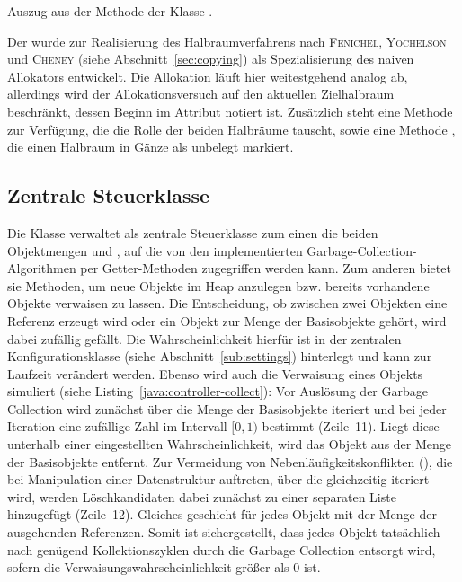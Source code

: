 \begin{listing}[h]
	\inputminted[]{java}{code/NaiveAlloc-allocate.java}
	\caption[Methode  der Klasse ]{Auszug aus der Methode  der Klasse .}
	\label{java:naive-alloc}
\end{listing}

Der  wurde zur Realisierung des Halbraumverfahrens nach \textsc{Fenichel}, \textsc{Yochelson} und \textsc{Cheney} (siehe Abschnitt~\ref{sec:copying}) als Spezialisierung des naiven Allokators entwickelt.
Die Allokation läuft hier weitestgehend analog ab, allerdings wird der Allokationsversuch auf den aktuellen Zielhalbraum beschränkt, dessen Beginn im Attribut  notiert ist.
Zusätzlich steht eine Methode  zur Verfügung, die die Rolle der beiden Halbräume tauscht, sowie eine Methode , die einen Halbraum in Gänze als unbelegt markiert.

\subsection{Zentrale Steuerklasse }
\label{sub:controller}
Die Klasse  verwaltet als zentrale Steuerklasse zum einen die beiden Objektmengen  und , auf die von den implementierten Garbage-Collection-Algorithmen per Getter-Methoden zugegriffen werden kann.
Zum anderen bietet sie Methoden, um neue Objekte im Heap anzulegen bzw. bereits vorhandene Objekte verwaisen zu lassen.
Die Entscheidung, ob zwischen zwei Objekten eine Referenz erzeugt wird oder ein Objekt zur Menge der Basisobjekte gehört, wird dabei zufällig gefällt.
Die Wahrscheinlichkeit hierfür ist in der zentralen Konfigurationsklasse  (siehe Abschnitt~\ref{sub:settings}) hinterlegt und kann zur Laufzeit verändert werden.
Ebenso wird auch die Verwaisung eines Objekts simuliert (siehe Listing~\ref{java:controller-collect}):
Vor Auslösung der Garbage Collection wird zunächst über die Menge der Basisobjekte iteriert und bei jeder Iteration eine zufällige Zahl im Intervall $[0,1)$ bestimmt (Zeile~11).
Liegt diese unterhalb einer eingestellten Wahrscheinlichkeit, wird das Objekt aus der Menge der Basisobjekte entfernt.
Zur Vermeidung von Nebenläufigkeitskonflikten (), die bei Manipulation einer Datenstruktur auftreten, über die gleichzeitig iteriert wird, werden Löschkandidaten dabei zunächst zu einer separaten Liste hinzugefügt (Zeile~12).
Gleiches geschieht für jedes Objekt mit der Menge  der ausgehenden Referenzen.
Somit ist sichergestellt, dass jedes Objekt tatsächlich nach genügend Kollektionszyklen durch die Garbage Collection entsorgt wird, sofern die Verwaisungswahrscheinlichkeit größer als $0$ ist.

